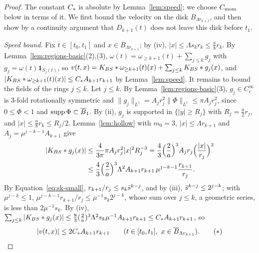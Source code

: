\begin{proof}
The constant $C_{*}$ is absolute by Lemma~\ref{lem:speed};
we choose $C_{\mathrm{mom}}$ below in terms of it. We first bound the
velocity on the disk $\overline B_{\Lambda r_{k+1}}$, and then show by a
continuity argument that $D_{k+1}(t)$ does not leave this disk before $t_1$.

\emph{Speed bound.} Fix $t\in[t_0,t_1]$ and $x\in\overline B_{\Lambda r_{k+1}}$;
by (iv), $|x|\le\Lambda s_kr_k\le\frac a8r_k$. By
Lemma~\ref{lem:regions-basic}(2),(3), $\omega(t)=\omega_{\ge k+1}(t)+\sum_{j\le k}g_j$
with $g_j=\omega(t)\mathbf 1_{S_j(t)}$, so
$v(t,x)=K_{BS}\ast\omega_{\ge k+1}(t)(x)+\sum_{j\le k}K_{BS}\ast g_j(x)$, and
$|K_{BS}\ast\omega_{\ge k+1}(t)(x)|\le C_{*} A_{k+1}r_{k+1}$ by Lemma~\ref{lem:speed}.
It remains to bound the fields of the rings $j\le k$. Let $j\le k$. By Lemma~\ref{lem:regions-basic}(3), $g_j\in C_c^\infty$ is
$3$-fold rotationally symmetric and $\|g_j\|_{L^1}=A_jr_j^2\|\Phi\|_{L^1}\le\pi A_jr_j^2$, since
$0\le\Phi<1$ and $\operatorname{supp}\Phi\subset\overline B_1$. By (ii), $g_j$ is supported in
$\{|y|\ge R_j\}$ with $R_j=\frac a2r_j$, and $|x|\le\frac a8r_k\le R_j/2$.
Lemma~\ref{lem:hollow} with $m_0=3$, $|x|\le\Lambda r_{k+1}$ and
$A_j=\mu^{j-k-1}A_{k+1}$ give
\begin{align*}
|K_{BS}\ast g_j(x)|&\le\frac4{3\pi}\pi A_jr_j^2|x|^2R_j^{-3}
=\frac43\Big(\frac2a\Big)^3A_jr_j\Big(\frac{|x|}{r_j}\Big)^2\\
&\le\frac43\Big(\frac2a\Big)^3\Lambda^2A_{k+1}r_{k+1}\,\mu^{j-k-1}\frac{r_{k+1}}{r_j}.
\end{align*}
By Equation~\eqref{eq:sk-small}, $r_{k+1}/r_j\le s_k\bar s^{k-j}$, and by (iii),
$\bar s^{k-j}\le2^{j-k}$; with $\mu^{j-k}\le1$,
$\mu^{j-k-1}r_{k+1}/r_j\le\mu^{-1}s_k2^{j-k}$, whose sum over
$j\le k$, a geometric series, is less than $2\mu^{-1}s_k$. By (iv),
$\sum_{j\le k}|K_{BS}\ast g_j(x)|\le\frac83(\frac2a)^3\Lambda^2s_k\mu^{-1}A_{k+1}r_{k+1}\le C_{*} A_{k+1}r_{k+1}$,
so
\[
|v(t,x)|\le2C_{*} A_{k+1}r_{k+1}\qquad(t\in[t_0,t_1],\ x\in\overline B_{\Lambda r_{k+1}}).\tag{$*$}
\]


\end{proof}
